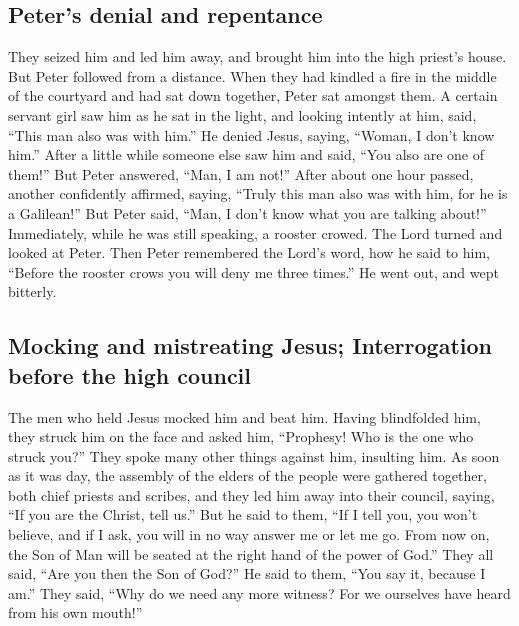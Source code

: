 \hypertarget{peters-denial-and-repentance}{%
\subsection{Peter's denial and
repentance}\label{peters-denial-and-repentance}}

 They seized him and led him away, and brought him into
the high priest's house. But Peter followed from a distance.
 When they had kindled a fire in the middle of the
courtyard and had sat down together, Peter sat amongst them.
 A certain servant girl saw him as he sat in the light,
and looking intently at him, said, ``This man also was with him.''
 He denied Jesus, saying, ``Woman, I don't know him.''
 After a little while someone else saw him and said,
``You also are one of them!'' But Peter answered, ``Man, I am not!''
 After about one hour passed, another confidently
affirmed, saying, ``Truly this man also was with him, for he is a
Galilean!''  But Peter said, ``Man, I don't know what you
are talking about!'' Immediately, while he was still speaking, a rooster
crowed.  The Lord turned and looked at Peter. Then Peter
remembered the Lord's word, how he said to him, ``Before the rooster
crows you will deny me three times.''  He went out, and
wept bitterly.

\hypertarget{mocking-and-mistreating-jesus-interrogation-before-the-high-council}{%
\subsection{Mocking and mistreating Jesus; Interrogation before the high
council}\label{mocking-and-mistreating-jesus-interrogation-before-the-high-council}}

 The men who held Jesus mocked him and beat him.
 Having blindfolded him, they struck him on the face and
asked him, ``Prophesy! Who is the one who struck you?'' 
They spoke many other things against him, insulting him. 
As soon as it was day, the assembly of the elders of the people were
gathered together, both chief priests and scribes, and they led him away
into their council, saying,  ``If you are the Christ,
tell us.'' But he said to them, ``If I tell you, you won't believe,
 and if I ask, you will in no way answer me or let me go.
 From now on, the Son of Man will be seated at the right
hand of the power of God.''  They all said, ``Are you
then the Son of God?'' He said to them, ``You say it, because I am.''
 They said, ``Why do we need any more witness? For we
ourselves have heard from his own mouth!''

